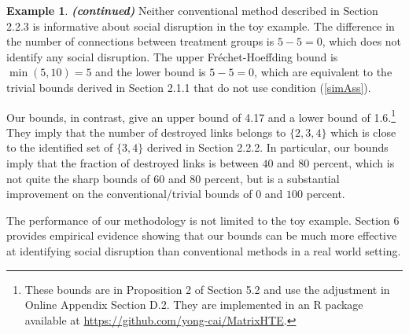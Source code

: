 \documentclass[12pt]{article}
\theoremstyle{definition}
\newtheorem{myexp}{Example}
\newenvironment{myexpcont}
{\addtocounter{myexp}{-1}\begin{myexp}{\textit{\textbf{{(continued)}}}}}
  {\end{myexp}}
\begin{document}
\begin{myexpcont}
Neither conventional method described in Section 2.2.3 is informative about social disruption in the toy example. The difference in the number of connections between treatment groups is $5 - 5 = 0$, which does not identify any social disruption. The upper Fr\'echet-Hoeffding bound is $\min(5,10) = 5$ and the lower bound is $5 - 5 = 0$, which are equivalent to the trivial bounds derived in Section 2.1.1 that do not use condition (\ref{simAss}).  

Our bounds, in contrast, give an upper bound of 4.17 and a lower bound of 1.6.\footnote{These bounds are in Proposition 2 of Section 5.2 and use the adjustment in Online Appendix Section  D.2. They are implemented in an R package available at \url{https://github.com/yong-cai/MatrixHTE}.} They imply that the number of destroyed links belongs to $\{2,3,4\}$ which is close to the identified set of $\{3,4\}$ derived in Section 2.2.2. In particular, our bounds imply that the fraction of destroyed links is between $40$ and $80$ percent, which is not quite the sharp bounds of $60$ and $80$ percent, but is a substantial improvement on the conventional/trivial bounds of $0$ and $100$ percent.  \end{myexpcont}

The performance of our methodology is not limited to the toy example. Section 6 provides empirical evidence showing that our bounds can be much more effective at identifying social disruption than conventional methods in a real world setting. 
\end{document}
